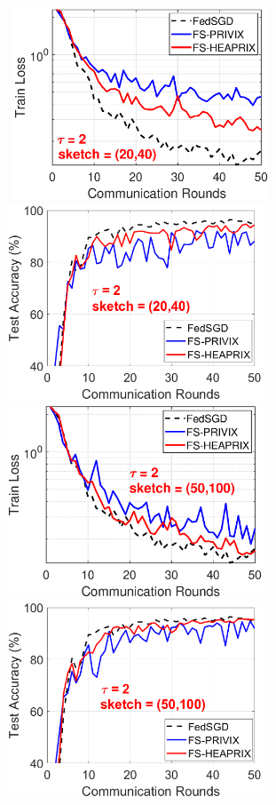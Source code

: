 \begin{figure}[h]
	\begin{center}
		\mbox{			    \includegraphics[width=3in]{MNIST_figures/local2_sketch20_iid0_train_loss.eps}
		\includegraphics[width=3in]{MNIST_figures/local2_sketch20_iid0_test_acc.eps}
		}
		\mbox{			   
		\includegraphics[width=3in]{MNIST_figures/local2_sketch50_iid0_train_loss.eps}
		\includegraphics[width=3in]{MNIST_figures/local2_sketch50_iid0_test_acc.eps}
		}
		

\end{center}
\end{figure}
